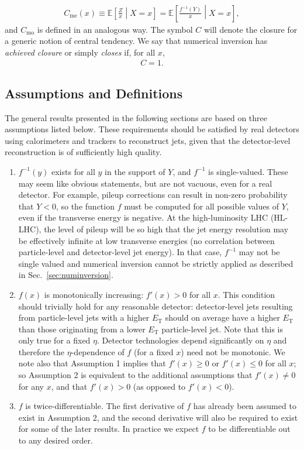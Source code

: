 \begin{align}
C_\text{me}(x) \equiv \mathbb{E}\left[\frac{Z}{x}\middle| X=x\right] = \mathbb{E}\left[\frac{f^{-1}(Y)}{x}\middle| X=x\right]
\label{eqn:closure},
\end{align}
and $C_\text{mo}$ is defined in an analogous way.  The symbol $C$ will denote the closure for a generic notion of central tendency.  We say that numerical inversion has {\it achieved closure} or simply {\it closes} if, for all $x$,
\begin{align}
C = 1.
\end{align}

\subsection{Assumptions and Definitions}
\label{sec:assumptions}

The general results presented in the following sections are based on three assumptions listed below.  These requirements should be satisfied by real detectors using calorimeters and trackers to reconstruct jets, given that the detector-level reconstruction is of sufficiently high quality.

\begin{enumerate}
\item $f^{-1}(y)$ exists for all $y$ in the support of $Y$, and $f^{-1}$ is single-valued.  These may seem like obvious statements, but are not vacuous, even for a real detector.  For example, pileup corrections can result in non-zero probability that $Y<0$, so the function $f$ must be computed for all possible values of $Y$, even if the transverse energy is negative.  At the high-luminosity LHC (HL-LHC), the level of pileup will be so high that the jet energy resolution may be effectively infinite at low transverse energies (no correlation between particle-level and detector-level jet energy).  In that case, $f^{-1}$ may not be single valued and numerical inversion cannot be strictly applied as described in Sec.~\ref{sec:numinversion}.
\item $f(x)$ is monotonically increasing: $f'(x)>0$ for all $x$.  This condition should trivially hold for any reasonable detector: detector-level jets resulting from particle-level jets with a higher $E_\text{T}$ should on average have a higher $E_\text{T}$ than those originating from a lower $E_\text{T}$ particle-level jet.  Note that this is only true for a fixed $\eta$.  Detector technologies depend significantly on $\eta$ and therefore the $\eta$-dependence of $f$ (for a fixed $x$) need not be monotonic. We note also that Assumption 1 implies that $f'(x)\ge 0$ or $f'(x) \le 0$ for all $x$; so Assumption 2 is equivalent to the additional assumptions that $f'(x)\ne 0$ for any $x$, and that $f'(x)>0$ (as opposed to $f'(x)<0$).
\item $f$ is twice-differentiable. The first derivative of $f$ has already been assumed to exist in Assumption 2, and the second derivative will also be required to exist for some of the later results. In practice we expect $f$ to be differentiable out to any desired order.
\end{enumerate}

